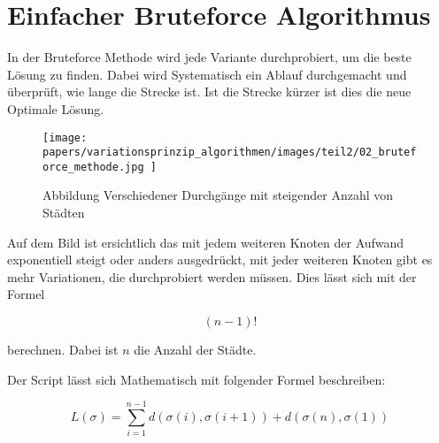 %
%
%
%
\section{Einfacher Bruteforce Algorithmus}
In der Bruteforce Methode wird jede Variante durchprobiert, 
um die beste Lösung zu finden. Dabei wird Systematisch ein 
Ablauf durchgemacht und überprüft, wie lange die Strecke ist.
Ist die Strecke kürzer ist dies die neue Optimale Lösung.

\begin{figure} [h]
	\centering
	\texttt{[image: 
        papers/variationsprinzip\_algorithmen/images/teil2/02\_bruteforce\_methode.jpg
        ]}
	\caption{Abbildung Verschiedener Durchgänge mit steigender Anzahl von Städten}
	\label{fig:Abbildung Verschiedener Durchgänge mit steigender Anzahl von Städten}
\end{figure}

Auf dem Bild ist ersichtlich das mit jedem weiteren Knoten der Aufwand 
exponentiell steigt oder anders ausgedrückt, mit jeder weiteren Knoten
gibt es mehr Variationen, die durchprobiert werden müssen. Dies lässt
sich mit der Formel

\begin{equation}
    (n-1)!
\end{equation}

berechnen. Dabei ist \(n\) die Anzahl der Städte.

Der Script lässt sich Mathematisch mit folgender Formel beschreiben:

\begin{equation}
    L(\sigma) = \sum_{i=1}^{n-1} d(\sigma(i), \sigma(i+1)) + d(\sigma(n), \sigma(1))
\end{equation}

